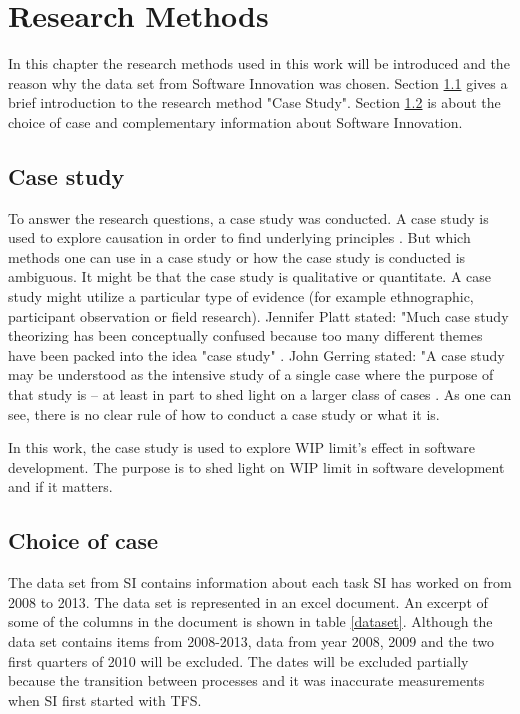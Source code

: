 \documentclass[UKenglish]{ifimaster}  %
\begin{document}
\chapter{Research Methods}
\label{chap:RM}
In this chapter the research methods used in this work will be introduced and the reason why the data set from Software Innovation was chosen. Section \ref{sec:CS} gives a brief introduction to the research method "Case Study".  Section \ref{sec:coc} is about the choice of case and complementary information about Software Innovation. 


\section{Case study}
\label{sec:CS}
To answer the research questions, a case study was conducted.  A case study is used to explore causation in order to find underlying principles \parencite{0078285763}\parencite{9781412960991}.  But which methods one can use in a case study or how the case study is conducted is ambiguous.  It might be that the case study is qualitative or quantitate.  A case study might utilize a particular type of evidence (for example ethnographic, participant observation or field research).  Jennifer Platt stated: "Much case study theorizing has been conceptually confused because too many different themes have been packed into the idea "case study" \parencite{0521676568}.  John Gerring stated: "A case study may be understood as the intensive study of a single case where the purpose of that study is -- at least in part to shed light on a larger class of cases  \parencite{0521676568}. As one can see, there is no clear rule of how to conduct a case study or what it is. 


In this work, the case study is used to explore WIP limit's effect in software development. The purpose is to shed light on WIP limit in software development and if it matters.

\section{Choice of case}
\label{sec:coc}
The data set from SI contains information about each task SI has worked on from 2008 to 2013. The data set is represented in an excel document. An excerpt of some of the columns in the document is shown in table \ref{dataset}. Although the data set contains items from 2008-2013, data from year 2008, 2009 and the two first quarters of 2010 will be excluded. The dates will be excluded partially because the transition between processes and it was inaccurate measurements when SI first started with TFS.
\end{document}
